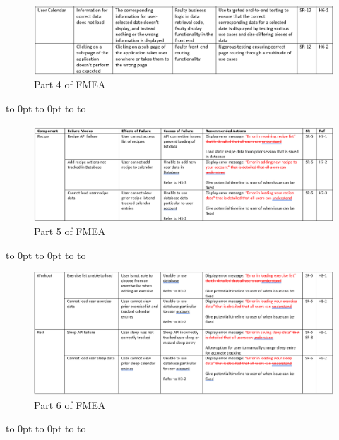 \documentclass{article}
\def\fillandplacepagenumber{%
 \par\pagestyle{empty}%
 \vbox to 0pt{\vss}\vfill
 \vbox to 0pt{\baselineskip0pt
   \hbox to\linewidth{\hss}%
   \baselineskip\footskip
   \hbox to\linewidth{%
     \hfil\thepage\hfil}\vss}}
\begin{document}
\begin{landscape}
	\begin{figure}[ht]
		\centering
		\includegraphics[angle=360, scale=1]{FMEA_4.png}
		\caption{Part 4 of FMEA}
	\end{figure}
	\fillandplacepagenumber
\end{landscape}

\begin{landscape}
	\begin{figure}[ht]
		\centering
		\includegraphics[angle=360, scale=1]{FMEA_5.png}
		\caption{Part 5 of FMEA}
	\end{figure}
	\fillandplacepagenumber
\end{landscape}

\begin{landscape}
	\begin{figure}[ht]
		\centering
		\includegraphics[angle=360, scale=0.9]{FMEA_6.png}
		\caption{Part 6 of FMEA}
	\end{figure}
	\fillandplacepagenumber
\end{landscape}
\end{document}
